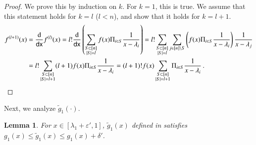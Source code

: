 \documentclass{article}[12pt]
\newtheorem{lemma}[theorem]{Lemma}
\theoremstyle{definition}
\renewcommand{\leq}{\leqslant}
\newcommand{\mper}{\,.}
\newcommand{\paren}[1]{\left(#1 \right )}
\newcommand{\Abs}[1]{\left\lvert#1\right\rvert}
\newcommand{\e}{\epsilon}
\let\e\varepsilon
\newcommand{\charp}{f}
\newcommand{\mom}{g}
\newcommand*\diff{\mathop{}\!\mathrm{d}}
\newcommand{\dx}{{\sf dx}}
\newcommand{\tg}{\tilde{g}}
\newcommand{\eprime}{\e'}
\begin{document}
\begin{proof}
We prove this by induction on $k$. 
For $k = 1$, this is true.  
We assume that this statement holds for $k = l$ ($l<n$), and show that it holds for $k = l+1$.
\begin{align*}
\charp^{(l+1)}(x) & = \frac{\diff}{\dx}\charp^{(l)}(x) = l! \frac{\diff}{\dx} 
		\paren{\sum_{ \substack{ S \subset [n] \\ \Abs{S} = l  } } 
		\charp(x)\Pi_{i \in S} \frac{1}{x - \lambda_i} } 
  = l!  \sum_{ \substack{ S \subset [n] \\ \Abs{S} = l  } } \sum_{j \in [n] \setminus S}
		\paren{\charp(x) \Pi_{i \in S} \frac{1}{x - \lambda_i}} \frac{1}{x - \lambda_j} \\
 & = l! \sum_{ \substack{ S \subset [n] \\ \Abs{S} = l +1}} (l+1)\charp(x) \Pi_{i \in S} \frac{1}{x - \lambda_i} 
	 = (l+1)! \charp(x) \sum_{ \substack{ S \subset [n] \\ \Abs{S} = l +1}} \Pi_{i \in S} \frac{1}{x - \lambda_i} \mper 
\end{align*}
\end{proof}

Next, we analyze $\tg_1(\cdot)$.
\begin{lemma}
\label{lem:tg1}
For $x \in [\lambda_1 + \eprime,1]$, 
$\tg_1(x)$ defined in  satisfies 
$ \mom_1(x) \leq \tg_1(x) \leq \mom_1(x) + \delta'  $.
\end{lemma}
\end{document}
